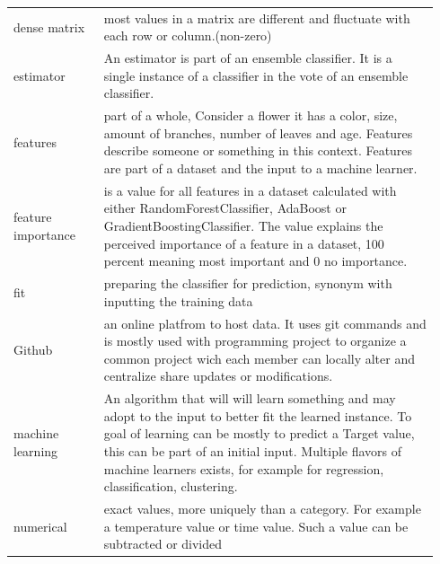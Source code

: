 \documentclass[a4paper,10pt]{article}
\begin{document}
\begin{tabular}{ p{0.20\linewidth} p{0.7437\linewidth} }
	dense matrix & most values in a matrix are different and fluctuate with each row or column.(non-zero)\\ [1ex]
		
	estimator & An estimator is part of an ensemble classifier. It is a single instance of a classifier in the vote of an ensemble classifier.\\ [1ex]
	
	features & part of a whole, Consider a flower it has a color, size, amount of branches, number of leaves and age. Features describe someone or something in this context. Features are part of a dataset and the input to a machine learner.\\ [1ex]
	
	feature importance & is a value for all features in a dataset calculated with either RandomForestClassifier, AdaBoost or GradientBoostingClassifier. The value explains the perceived importance of a feature in a dataset, 100 percent meaning most important and 0 no importance.  \\ [1ex]
	
	fit & preparing the classifier for prediction, synonym with inputting the training data \\ [1ex]
	
	Github & an online platfrom to host data. It uses git commands and is mostly used with programming project to organize a common project wich each member can locally alter and centralize share updates or modifications. \\ [1ex]	
	
	machine learning & An algorithm that will will learn something and may adopt to the input to better fit the learned instance. To goal of learning can be mostly to predict a Target value, this can be part of an initial input. Multiple flavors of machine learners exists, for example for regression, classification, clustering.\\ [1ex]	
	
	numerical & exact values, more uniquely than a category. For example a temperature value or time value. Such a value can be subtracted or divided \\ [1ex]	
\end{tabular}
\newpage
\end{document}
